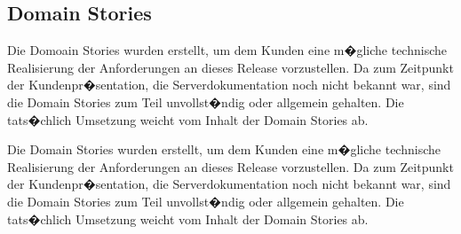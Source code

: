 \documentclass[12pt, titlepage]{scrartcl}
\begin{document}
	\subsection{Domain Stories}
		Die Domoain Stories wurden erstellt, um dem Kunden eine m�gliche technische Realisierung der Anforderungen an dieses Release vorzustellen. Da zum Zeitpunkt der Kundenpr�sentation, die Serverdokumentation noch nicht bekannt war, sind die Domain Stories zum Teil unvollst�ndig oder allgemein gehalten. Die tats�chlich Umsetzung weicht vom Inhalt der Domain Stories ab.
	
		Die Domain Stories wurden erstellt, um dem Kunden eine m�gliche technische Realisierung der Anforderungen an dieses Release vorzustellen. Da zum Zeitpunkt der Kundenpr�sentation, die Serverdokumentation noch nicht bekannt war, sind die Domain Stories zum Teil unvollst�ndig oder allgemein gehalten. Die tats�chlich Umsetzung weicht vom Inhalt der Domain Stories ab.
\end{document}
